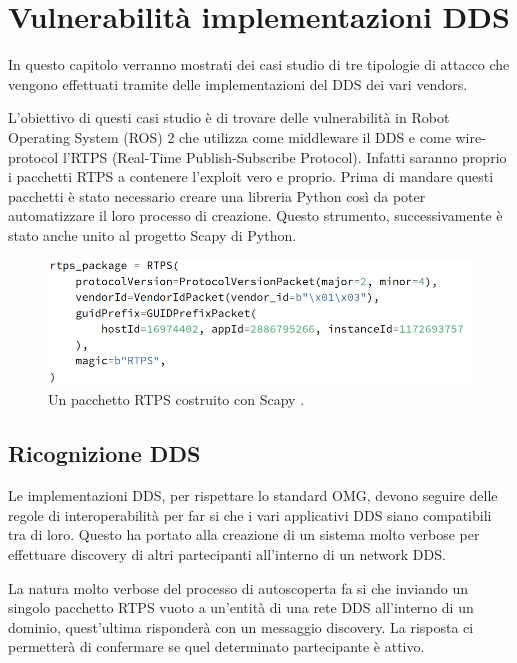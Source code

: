 \chapter{Vulnerabilità implementazioni DDS}
\label{chvulimpldds}

In questo capitolo verranno mostrati dei casi studio
di tre tipologie di 
attacco che vengono effettuati tramite delle 
implementazioni del DDS dei vari vendors.

L'obiettivo di questi casi studio è di trovare delle 
vulnerabilità in Robot Operating System (ROS) 2 che 
utilizza come middleware il DDS e come wire-protocol 
l'RTPS (Real-Time Publish-Subscribe Protocol).
Infatti saranno proprio i pacchetti RTPS a contenere 
l'exploit vero e proprio. Prima di mandare questi 
pacchetti è stato necessario creare una libreria Python 
così da poter automatizzare il loro processo di creazione.
Questo strumento, successivamente è stato anche unito al 
progetto Scapy di Python.

\begin{figure}[H]
    \centering
    \includegraphics[width=15.2cm, keepaspectratio]{img/rptspacketheaderscapy.png}
    \caption{Un pacchetto RTPS costruito 
    con Scapy \cite{mayoral2022robot}.}
    \label{rptspacketheaderscapy}
\end{figure}

\section{Ricognizione DDS}
Le implementazioni DDS, per rispettare lo standard 
OMG, devono seguire delle regole di interoperabilità 
per far si che i vari applicativi DDS siano compatibili 
tra di loro. Questo ha portato alla creazione di un sistema
molto verbose per effettuare discovery 
di altri partecipanti all'interno di un network DDS.


La natura molto verbose del processo di autoscoperta 
fa si che inviando un singolo pacchetto RTPS vuoto 
a un'entità di una rete DDS all'interno di un dominio,
quest'ultima risponderà 
con un messaggio discovery. La risposta ci permetterà di 
confermare se quel determinato partecipante è attivo.

